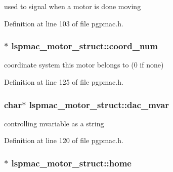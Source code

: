 used to signal when a motor is done moving 



Definition at line 103 of file pgpmac.\-h.

\hypertarget{structlspmac__motor__struct_a5614e003272e8323f8809bf7b6559532}{
\subsubsection[{coord\-\_\-num}]{$\ast$ lspmac\-\_\-motor\-\_\-struct\-::coord\-\_\-num}}\label{structlspmac__motor__struct_a5614e003272e8323f8809bf7b6559532}


coordinate system this motor belongs to (0 if none) 



Definition at line 125 of file pgpmac.\-h.

\hypertarget{structlspmac__motor__struct_a05dff021221abbc1bf656039fffb3275}{
\subsubsection[{dac\-\_\-mvar}]{\setlength{\rightskip}{0pt plus 5cm}char$\ast$ lspmac\-\_\-motor\-\_\-struct\-::dac\-\_\-mvar}}\label{structlspmac__motor__struct_a05dff021221abbc1bf656039fffb3275}


controlling mvariable as a string 



Definition at line 120 of file pgpmac.\-h.

\hypertarget{structlspmac__motor__struct_a6dc1ceab86687f741d4c4a574501959c}{
\subsubsection[{home}]{$\ast$ lspmac\-\_\-motor\-\_\-struct\-::home}}\label{structlspmac__motor__struct_a6dc1ceab86687f741d4c4a574501959c}


